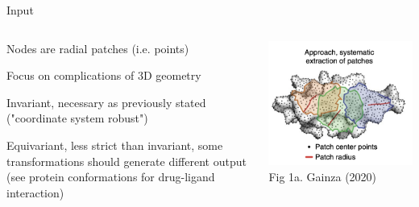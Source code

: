 \documentclass{beamer}
\begin{document}
\iffalse 
            \begin{frame}{Input}
                \begin{columns}
                \begin{column}{0.7\textwidth}
                \begin{itemize}\setlength\itemsep{6mm}
                    \color{red}
                    \item Nodes are radial patches (i.e. points)
                    \item Focus on complications of 3D geometry 
                    \vspace{8mm}
                    \begin{minipage}{\textwidth}
                    \item Invariant, necessary as previously stated ("coordinate system robust")
                    \item Equivariant, less strict than invariant, some transformations should generate different output (see protein conformations for drug-ligand interaction) 
                    \end{minipage}
                \end{itemize}
                \end{column}

                \begin{column}{0.3\textwidth}
                    \vspace*{-12mm}
                        \begin{flushright}
                        \includegraphics[width=\textwidth]{Gainza_2020_ProteinNodesRadii.png}  \\ 
                        Fig 1a. Gainza (2020) \cite{gainza_deciphering_2020}
                        \end{flushright}
                \end{column}
            \end{columns}
            \end{frame}
\end{document}
